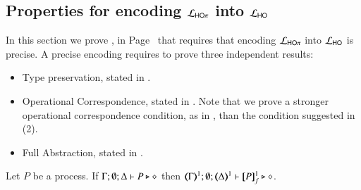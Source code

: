 


\subsection{Properties for encoding $\mathcal{L}_{\mathsf{HO}\pi}$ into $\mathcal{L}_{\mathsf{HO}}$}
\label{app:enc_HOp_to_HO}


In this section we prove , in Page~\pageref{f:enc:hopitoho}
that requires that encoding
$\mathcal{L}_{\mathsf{HO}\pi}$ into $\mathcal{L}_{\mathsf{HO}}$ is precise.
A precise encoding requires to prove three independent results:
\begin{itemize}
	\item	Type preservation, stated in .
	\item	Operational Correspondence, stated in .
		Note that we prove a stronger operational correspondence condition,
		as in ,
		than the condition suggested in (2).
	\item	Full Abstraction, stated in .
\end{itemize}


\begin{proposition}
	\label{app:prop:typepres_HOp_to_HO}
	Let $P$ be a \HOp process.
	If $\Gamma; \emptyset; \Delta \vdash P \triangleright \diamond$ then 
	$\mapt{\Gamma}^{1}; \emptyset; \mapt{\Delta}^{1} \proves \pmapp{P}{1}{f} \hastype \Proc$. 
\end{proposition}

